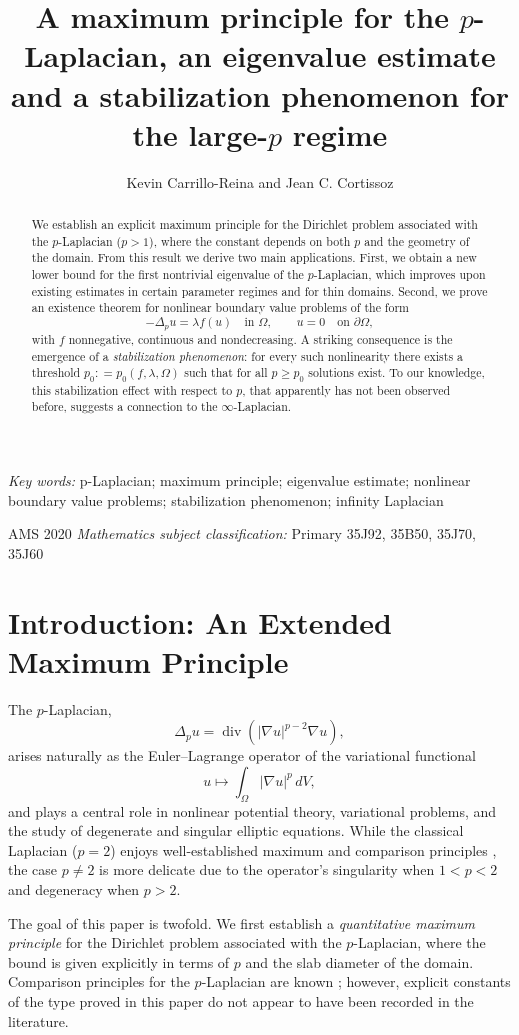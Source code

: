 \documentclass[11pt]{amsart}
\title[Maximum Principle, Eigenvalues and Stabilization]{A maximum principle for the $p$-Laplacian, an eigenvalue estimate
and a stabilization phenomenon for the large-$p$ regime}
\author{Kevin Carrillo-Reina and Jean C. Cortissoz}
\date{}
\newcommand{\amsprimary}[1]{{\footnotesize\noindent AMS 2020 \textit{Mathematics subject
classification:} Primary #1\vspace{1pc}}}
\newcommand{\keywordsnames}[1]{{\footnotesize\noindent\textit{Key words:} #1\vspace{1pc}}}
\theoremstyle{definition}
\begin{document}
\begin{abstract}
We establish an explicit maximum principle for the Dirichlet problem associated with the $p$-Laplacian ($p>1$), where the constant depends on both $p$ and the geometry of the domain. From this result we derive two main applications. First, we obtain a new lower bound for the first nontrivial eigenvalue of the $p$-Laplacian, which improves upon existing estimates in certain parameter regimes and for thin domains. Second, we prove an existence theorem for nonlinear boundary value problems of the form
\[
-\Delta_p u = \lambda f(u) \quad \text{in } \Omega, \qquad u=0 \quad \text{on } \partial \Omega,
\]
with $f$ nonnegative, continuous and nondecreasing. A striking consequence is the emergence of a \emph{stabilization phenomenon}: for every such nonlinearity there exists a threshold $p_0 \colon = p_0(f,\lambda,\Omega)$ such that for all $p \geq p_0$ 
solutions exist. To our knowledge, this stabilization effect with respect to $p$, that apparently has not been observed before, suggests a connection to the $\infty$-Laplacian.
\end{abstract}

\maketitle

\keywordsnames{p-Laplacian; maximum principle; eigenvalue estimate; nonlinear boundary value problems; stabilization phenomenon; infinity Laplacian}

{\amsprimary {35J92, 35B50, 35J70, 35J60}}

\section{Introduction: An Extended Maximum Principle}

The $p$-Laplacian,
\[
\Delta_p u = \operatorname{div}\!\left( |\nabla u|^{p-2} \nabla u \right),
\]
arises naturally as the Euler--Lagrange operator of the variational functional
\[
u \mapsto \int_\Omega |\nabla u|^p \, dV,
\]
and plays a central role in nonlinear potential theory, variational problems, and the study of degenerate and singular elliptic equations. While the classical Laplacian ($p=2$) enjoys well-established maximum and comparison principles \cite{GilbargTrudinger}, the case $p \neq 2$ is more delicate due to the operator's singularity when $1<p<2$ and degeneracy when $p>2$.

\medskip
The goal of this paper is twofold. We first establish a \emph{quantitative maximum principle} for the Dirichlet problem associated with the $p$-Laplacian, where the bound is given explicitly in terms of $p$ and the slab diameter of the domain. Comparison principles for the $p$-Laplacian are known \cite{Tolksdorf1983,GarciaMelianSabina1998};
however, explicit constants of the type proved in this paper do not appear to have been recorded in the literature.
\end{document}
